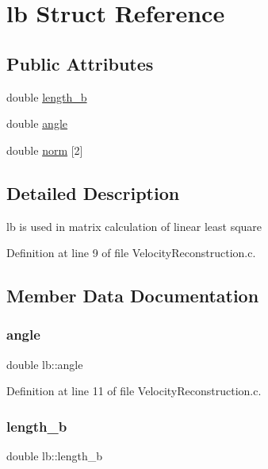 \hypertarget{structlb}{}\section{lb Struct Reference}
\label{structlb}
\subsection*{Public Attributes}
\begin{DoxyCompactItemize}
\item 
double \mbox{\hyperlink{structlb_a7f4b1a6c1c8446cde504704489e9a75f}{length\+\_\+b}}
\item 
double \mbox{\hyperlink{structlb_a284a6ff364b4f64628f7a02f24251cb1}{angle}}
\item 
double \mbox{\hyperlink{structlb_a661e852334d1c5f1c8552b1eb2f06db8}{norm}} \mbox{[}2\mbox{]}
\end{DoxyCompactItemize}


\subsection{Detailed Description}
lb is used in matrix calculation of linear least square 

Definition at line 9 of file Velocity\+Reconstruction.\+c.



\subsection{Member Data Documentation}
\mbox{\label{structlb_a284a6ff364b4f64628f7a02f24251cb1}} 
\subsubsection{\texorpdfstring{angle}{angle}}
{\footnotesize\ttfamily double lb\+::angle}



Definition at line 11 of file Velocity\+Reconstruction.\+c.

\mbox{\label{structlb_a7f4b1a6c1c8446cde504704489e9a75f}} 
\subsubsection{\texorpdfstring{length\_b}{length\_b}}
{\footnotesize\ttfamily double lb\+::length\+\_\+b}



